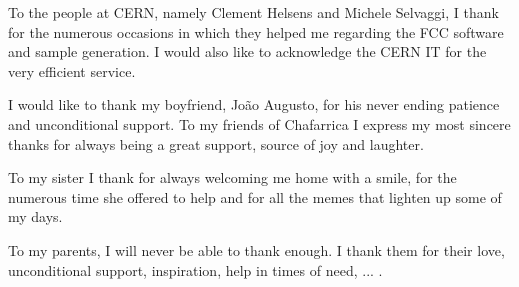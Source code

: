 To the people at CERN, namely Clement Helsens and Michele Selvaggi, I thank for the numerous occasions in which they helped me regarding the FCC software and sample generation. I would also like to acknowledge the CERN IT for the very efficient service. 

I would like to thank my boyfriend, Jo\~ao Augusto, for his never ending patience and unconditional support. To my friends of Chafarrica I express my most sincere thanks for always being a great support, source of joy and laughter. 

To my sister I thank for always welcoming me home with a smile, for the numerous time she offered to help and for all the memes that lighten up some of my days.

To my parents, I will never be able to thank enough. I thank them for their love, unconditional support, inspiration, help in times of need, ... . 
